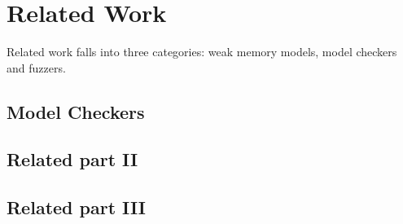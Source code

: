 \chapter{\label{cha:related}Related Work}

Related work falls into three categories: weak memory models, model checkers and fuzzers. 

\section{Model Checkers}
 

\section{Related part II}

   
\section{Related part III}


